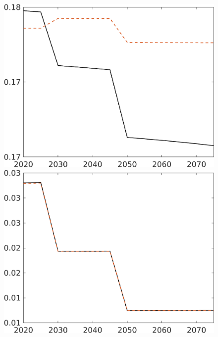 \begin{figure}[h!!]
\begin{minipage}[]{0.32\textwidth}
	\end{minipage}
	\begin{minipage}[]{0.32\textwidth}
		\includegraphics[width=1\textwidth]{../../codding_model/own_basedOnFried/optimalPol_elastS_DisuSci/figures/all_1705/comp_notaul_OPT_T_NoTaus_Ln_spillover0_sep1_BN0_ineq0_red0_etaa0.79_lgd0.png}
	\end{minipage}
	\begin{minipage}[]{0.32\textwidth}
		\includegraphics[width=1\textwidth]{../../codding_model/own_basedOnFried/optimalPol_elastS_DisuSci/figures/all_1705/comp_notaul_OPT_T_NoTaus_sff_spillover0_sep1_BN0_ineq0_red0_etaa0.79_lgd0.png}

\end{minipage}
\end{figure}
